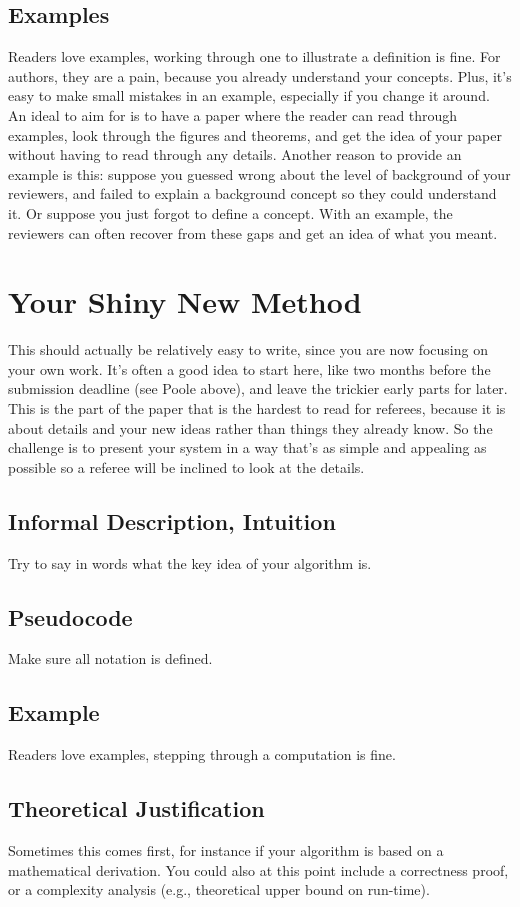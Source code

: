 \documentclass{article}
\begin{document}
\subsection{Examples} Readers love examples, working through one to illustrate a definition is fine. For authors, they are a pain, because you already understand your concepts. Plus, it's easy to make small mistakes in an example, especially if you change it around. An ideal to aim for is to have a paper where the reader can read through examples, look through the figures and theorems, and get the idea of your paper without having to read through any details. Another reason to provide an example is this: suppose you guessed wrong about the level of background of  your reviewers, and failed to explain  a background concept so they could understand it. Or suppose you just forgot to define a concept. With an example, the reviewers can often recover from these gaps and get an idea of what you meant.

\section{Your Shiny New Method} This should actually be relatively easy to write, since you are now focusing on your own work. It's often a good idea to start here, like two months before the submission deadline (see Poole above), and leave the trickier early parts for later. This is the part of the paper that is the hardest to read for referees, because it is about details and your new ideas rather than things they already know. So the challenge is to present your system in a way that's as simple and appealing as possible so a referee will be inclined to look at the details.
\subsection{Informal Description, Intuition} Try to say in words what the key idea of your algorithm is.
\subsection{Pseudocode} Make sure all notation is defined.
\subsection{Example} Readers love examples, stepping through a computation is fine.  \subsection{Theoretical Justification} Sometimes this comes first, for instance if your algorithm is based on a mathematical derivation. You could also at this point include a correctness proof, or a complexity analysis (e.g., theoretical upper bound on run-time).
\end{document}
